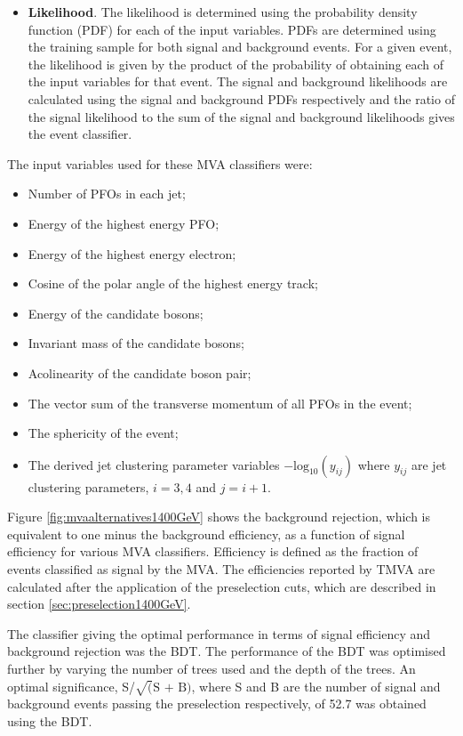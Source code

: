 \begin{itemize}
\item \textbf{Likelihood}.  The likelihood is determined using the probability density function (PDF) for each of the input variables.  PDFs are determined using the training sample for both signal and background events.  For a given event, the likelihood is given by the product of the probability of obtaining each of the input variables for that event.  The signal and background likelihoods are calculated using the signal and background PDFs respectively and the ratio of the signal likelihood to the sum of the signal and background likelihoods gives the event classifier.   
\end{itemize}

The input variables used for these MVA classifiers were:
\begin{itemize}
\item Number of PFOs in each jet;
\item Energy of the highest energy PFO;
\item Energy of the highest energy electron;
\item Cosine of the polar angle of the highest energy track;
\item Energy of the candidate bosons;
\item Invariant mass of the candidate bosons;
\item Acolinearity of the candidate boson pair;
\item The vector sum of the transverse momentum of all PFOs in the event;
\item The sphericity of the event;
\item The derived jet clustering parameter variables $-\text{log}_{10}(y_{ij})$ where $y_{ij}$ are jet clustering parameters, $i = 3,4$ and $j=i+1$.  
\end{itemize}

Figure \ref{fig:mvaalternatives1400GeV} shows the background rejection, which is equivalent to one minus the background efficiency, as a function of signal efficiency for various MVA classifiers.  Efficiency is defined as the fraction of events classified as signal by the MVA.  The efficiencies reported by TMVA are calculated after the application of the preselection cuts, which are described in section \ref{sec:preselection1400GeV}.  

The classifier giving the optimal performance in terms of signal efficiency and background rejection was the BDT.  The performance of the BDT was optimised further by varying the number of trees used and the depth of the trees.  An optimal significance, S/$\sqrt(\text{S + B})$, where S and B are the number of signal and background events passing the preselection respectively, of 52.7 was obtained using the BDT. 

